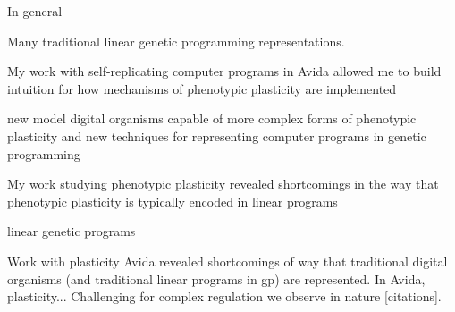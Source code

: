 
In general

Many traditional linear genetic programming representations.

My work with self-replicating computer programs in Avida allowed me to build intuition for how mechanisms of phenotypic plasticity are implemented 

new model digital organisms capable of more complex forms of phenotypic plasticity
and new techniques for representing computer programs in genetic programming

My work studying phenotypic plasticity revealed shortcomings in the way that phenotypic plasticity is typically encoded in linear programs 

linear genetic programs 

Work with plasticity Avida revealed shortcomings of way that traditional digital organisms (and traditional linear programs in gp) are represented. 
In Avida, plasticity...
Challenging for complex regulation we observe in nature [citations].